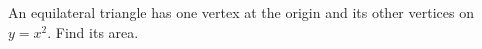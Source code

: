 An equilateral triangle has one vertex at the origin and its other vertices on $y=x^2$. Find its area.
